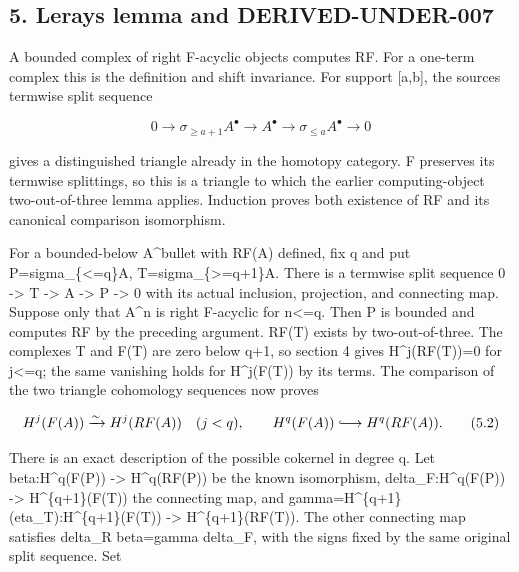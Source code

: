 \subsection{5. Leray\textquotesingle s lemma and DERIVED-UNDER-007}\label{proofs-5091-5900-lerays-lemma-and-derived-under-007}

A bounded complex of right F-acyclic objects computes RF. For a one-term complex this is the definition and shift invariance. For support [a,\allowbreak{}b]\allowbreak{},\allowbreak{} the source\textquotesingle s termwise split sequence

\[
0\to\sigma_{\ge a+1}A^\bullet\to A^\bullet
                      \to\sigma_{\le a}A^\bullet\to0          \tag{5.1}
\]

gives a distinguished triangle already in the homotopy category. F preserves its termwise splittings,\allowbreak{} so this is a triangle to which the earlier computing-object two-out-of-three lemma applies. Induction proves both existence of RF and its canonical comparison isomorphism.

For a bounded-below A\^{}bullet with RF(A)\allowbreak{} defined,\allowbreak{} fix q and put P\allowbreak{}=sigma\_\allowbreak{}\{<\allowbreak{}=q\}A,\allowbreak{} T\allowbreak{}=sigma\_\allowbreak{}\{>\allowbreak{}=q\allowbreak{}+1\}A. There is a termwise split sequence 0 \allowbreak{}-> T \allowbreak{}-> A \allowbreak{}-> P \allowbreak{}-> 0 with its actual inclusion,\allowbreak{} projection,\allowbreak{} and connecting map. Suppose only that A\^{}n is right F-acyclic for n<\allowbreak{}=q. Then P is bounded and computes RF by the preceding argument. RF(T)\allowbreak{} exists by two-out-of-three. The complexes T and F(T)\allowbreak{} are zero below q\allowbreak{}+1,\allowbreak{} so section 4 gives H\textasciicircum{}j(RF(T)\allowbreak{})\allowbreak{}\allowbreak{}=0 for j<\allowbreak{}=q; the same vanishing holds for H\textasciicircum{}j(F(T)\allowbreak{})\allowbreak{} by its terms. The comparison of the two triangle cohomology sequences now proves

\[
 H^j(F(A))\xrightarrow{\sim}H^j(RF(A))\quad(j<q),
 \qquad H^q(F(A))\lhook\joinrel\longrightarrow H^q(RF(A)). \tag{5.2}
\]

There is an exact description of the possible cokernel in degree q. Let beta:\allowbreak{}H\textasciicircum{}q(F(P)\allowbreak{})\allowbreak{} \allowbreak{}-> H\textasciicircum{}q(RF(P)\allowbreak{})\allowbreak{} be the known isomorphism,\allowbreak{} delta\_\allowbreak{}F:\allowbreak{}H\textasciicircum{}q(F(P)\allowbreak{})\allowbreak{} \allowbreak{}-> H\textasciicircum{}\{q\allowbreak{}+1\}(F(T)\allowbreak{})\allowbreak{} the connecting map,\allowbreak{} and gamma\allowbreak{}=H\textasciicircum{}\{q\allowbreak{}+1\}(eta\_\allowbreak{}T)\allowbreak{}:\allowbreak{}H\textasciicircum{}\{q\allowbreak{}+1\}(F(T)\allowbreak{})\allowbreak{} \allowbreak{}-> H\textasciicircum{}\{q\allowbreak{}+1\}(RF(T)\allowbreak{})\allowbreak{}. The other connecting map satisfies delta\_\allowbreak{}R beta\allowbreak{}=gamma delta\_\allowbreak{}F,\allowbreak{} with the signs fixed by the same original split sequence. Set

